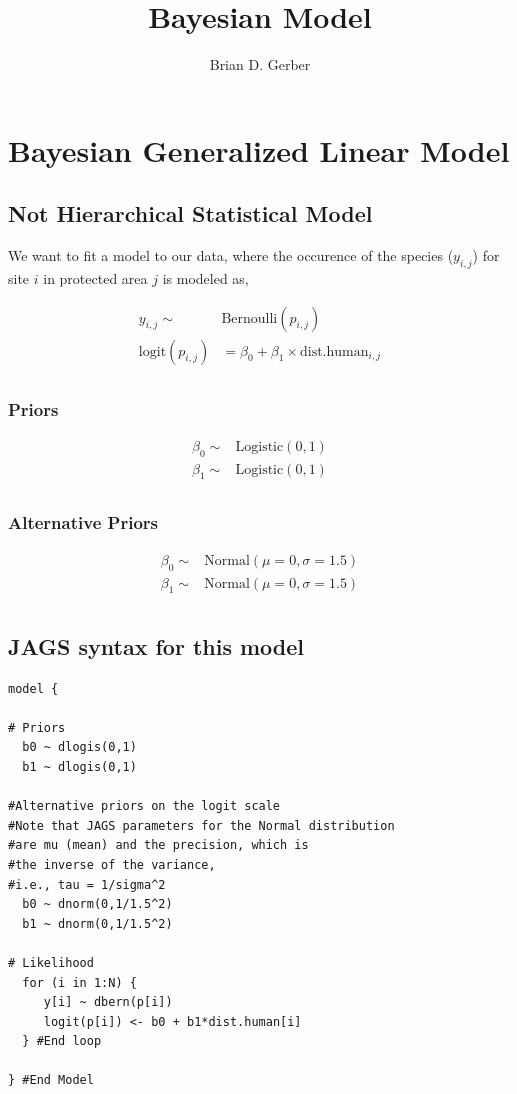 \documentclass[12pt]{article}
\title{Bayesian  Model}
\author{Brian D. Gerber}
\begin{document}
\maketitle
\section{Bayesian Generalized Linear  Model}
\subsection{Not Hierarchical Statistical Model}

\Large

We want to fit a model to our data, where the occurence of the species ($y_{i,j}$) for site $i$ in protected area $j$ is modeled as,

\begin{align*}
y_{i,j}\sim& \text{Bernoulli}(p_{i,j})\\
\text{logit}(p_{i,j}) &= \beta_{0} + \beta_{1}\times \text{dist.human}_{i,j}\\
\end{align*}

\subsubsection{Priors}

\begin{align*}
\beta_{0} \sim& \text{Logistic}(0, 1)\\
\beta_{1} \sim& \text{Logistic}(0, 1)\\
\end{align*}


\subsubsection{Alternative Priors}


\begin{align*}
\beta_{0} \sim& \text{Normal}(\mu = 0, \sigma = 1.5)\\
\beta_{1} \sim& \text{Normal}(\mu= 0, \sigma = 1.5)\\
\end{align*}


\pagebreak

\subsection{JAGS syntax for this model}

\begin{verbatim}
model {

# Priors
  b0 ~ dlogis(0,1)
  b1 ~ dlogis(0,1)

#Alternative priors on the logit scale
#Note that JAGS parameters for the Normal distribution
#are mu (mean) and the precision, which is 
#the inverse of the variance,
#i.e., tau = 1/sigma^2
  b0 ~ dnorm(0,1/1.5^2)
  b1 ~ dnorm(0,1/1.5^2)

# Likelihood
  for (i in 1:N) {
     y[i] ~ dbern(p[i])
     logit(p[i]) <- b0 + b1*dist.human[i]
  } #End loop
  
} #End Model
\end{verbatim}
\end{document}
